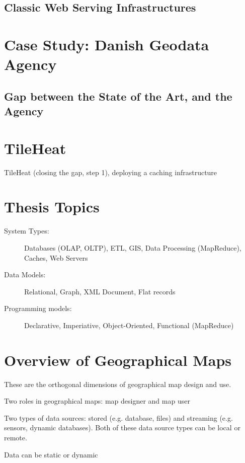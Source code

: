 \documentclass[11pt, oneside]{report}   	%
\begin{document}
\section{Classic Web Serving Infrastructures}

\chapter{Case Study: Danish Geodata Agency}

\section{Gap between the State of the Art, and the Agency}

\chapter{TileHeat}
TileHeat (closing the gap, step 1), deploying a caching infrastructure




\chapter{Thesis Topics}

\begin{description}
\item [System Types:] Databases (OLAP, OLTP), ETL, GIS, Data Processing (MapReduce), Caches, Web Servers
\item [Data Models:] Relational, Graph, XML Document, Flat records 
\item [Programming models:] Declarative, Imperiative, Object-Oriented, Functional (MapReduce)
\end{description}

\chapter{Overview of Geographical Maps}

These are the orthogonal dimensions of geographical map design and use.

Two roles in geographical maps: map designer and map user

Two types of data sources: stored (e.g. database, files) and streaming (e.g. sensors, dynamic databases). Both of these data source types can be local or remote.

Data can be static or dynamic
\end{document}
